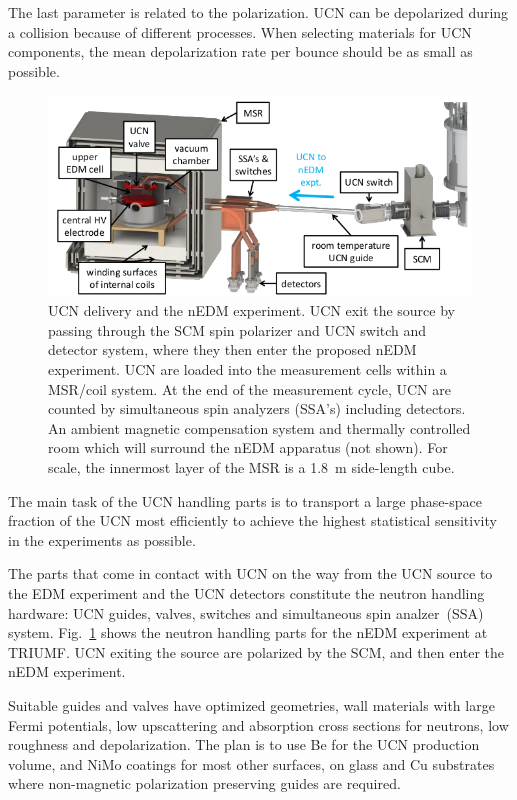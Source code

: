 The last parameter is related to the polarization. UCN can be
depolarized during a collision because of different processes.
When selecting materials for UCN components, the mean depolarization
rate per bounce should be as small as possible.
\begin{figure}[h!]
  \centering
  \includegraphics[width=1.0\textwidth]{UCNdelivery.png}
  \caption{UCN delivery and the nEDM experiment. UCN exit the source
    by passing through the SCM spin polarizer and UCN switch and
    detector system, where they then enter the proposed nEDM
    experiment. UCN are loaded into the measurement cells within a
    MSR/coil system. At the end of the measurement cycle, UCN are
    counted by simultaneous spin analyzers (SSA’s) including
    detectors. An ambient magnetic compensation system and thermally
    controlled room which will surround the nEDM apparatus (not
    shown). For scale, the innermost layer of the MSR is a 1.8~m
    side-length cube.}
  \label{fig:UCNdelivery}
\end{figure}



The main task of the UCN handling parts is to transport a large
phase-space fraction of the UCN most efficiently to achieve the
highest statistical sensitivity in the experiments as possible.

The parts that come in
contact with UCN on the way from the UCN source to the EDM experiment
and the UCN detectors constitute the neutron handling hardware: UCN
guides, valves, switches and simultaneous spin
analzer~(SSA) system. Fig.~\ref{fig:UCNdelivery} shows the neutron handling
parts for the nEDM experiment at TRIUMF.  UCN exiting the source are
polarized by the SCM, and then enter the nEDM experiment.

Suitable guides and valves have optimized geometries, wall materials
with large Fermi potentials, low upscattering and absorption cross
sections for neutrons, low roughness and depolarization. The plan is
to use Be for the UCN production volume, and NiMo coatings for most
other surfaces, on glass and Cu substrates where non-magnetic
polarization preserving guides are required.  

